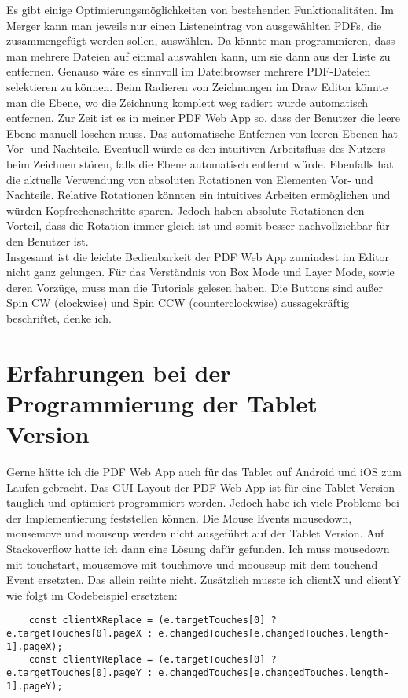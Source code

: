 Es gibt einige Optimierungsmöglichkeiten von bestehenden Funktionalitäten. Im Merger kann man jeweils nur einen Listeneintrag von ausgewählten PDFs, die zusammengefügt werden sollen, auswählen. Da könnte man programmieren, dass man mehrere Dateien auf einmal auswählen kann, um sie dann aus der Liste zu entfernen. Genauso wäre es sinnvoll im Dateibrowser mehrere PDF-Dateien selektieren zu können. Beim Radieren von Zeichnungen im Draw Editor könnte man die Ebene, wo die Zeichnung komplett weg radiert wurde automatisch entfernen. Zur Zeit ist es in meiner PDF Web App so, dass der Benutzer die leere Ebene manuell löschen muss. Das automatische Entfernen von leeren Ebenen hat Vor- und Nachteile. Eventuell würde es den intuitiven Arbeitsfluss des Nutzers beim Zeichnen stören, falls die Ebene automatisch entfernt würde. Ebenfalls hat die aktuelle Verwendung von absoluten Rotationen von Elementen Vor- und Nachteile. Relative Rotationen könnten ein intuitives Arbeiten ermöglichen und würden Kopfrechenschritte sparen. Jedoch haben absolute Rotationen den Vorteil, dass die Rotation immer gleich ist und somit besser nachvollziehbar für den Benutzer ist. \\
Insgesamt ist die leichte Bedienbarkeit der PDF Web App zumindest im Editor nicht ganz gelungen. Für das Verständnis von Box Mode und Layer Mode, sowie deren Vorzüge, muss man die Tutorials gelesen haben. Die Buttons sind außer Spin CW (clockwise) und Spin CCW (counterclockwise) aussagekräftig beschriftet, denke ich. 

\section{Erfahrungen bei der Programmierung der Tablet Version}
Gerne hätte ich die PDF Web App auch für das Tablet auf Android und iOS zum Laufen gebracht. Das GUI Layout der PDF Web App ist für eine Tablet Version tauglich und optimiert programmiert worden. Jedoch habe ich viele Probleme bei der Implementierung feststellen können. Die Mouse Events mousedown, mousemove und mouseup werden nicht ausgeführt auf der Tablet Version. Auf Stackoverflow hatte ich dann eine Lösung dafür gefunden. Ich muss mousedown mit touchstart, mousemove mit touchmove und moouseup mit dem touchend Event ersetzten. Das allein reihte nicht. Zusätzlich musste ich clientX und clientY wie folgt im Codebeispiel ersetzten:

\begin{lstlisting}
	const clientXReplace = (e.targetTouches[0] ? e.targetTouches[0].pageX : e.changedTouches[e.changedTouches.length-1].pageX);
	const clientYReplace = (e.targetTouches[0] ? e.targetTouches[0].pageY : e.changedTouches[e.changedTouches.length-1].pageY);
\end{lstlisting} 


